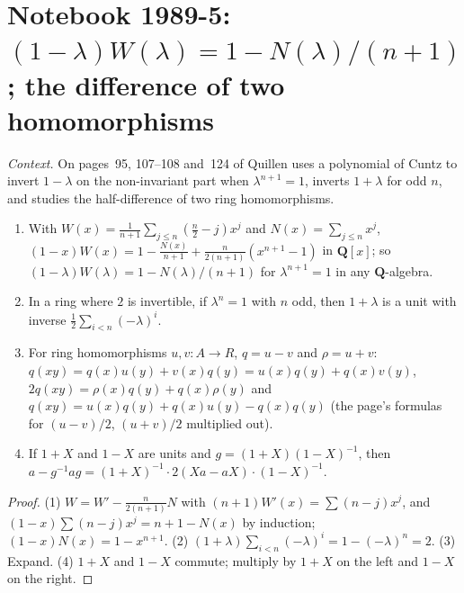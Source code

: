 \section[Notebook 1989-5: Cuntz's polynomial and two homomorphisms]{Notebook 1989-5: $(1 - \lambda)W(\lambda) = 1 - N(\lambda)/(n + 1)$; the difference of two homomorphisms\protect{}}\label{sec:quillen-1989-5}

\emph{Context.} On pages~95, 107--108 and~124 of  Quillen uses a polynomial of Cuntz to invert $1 - \lambda$ on the non-invariant part when $\lambda^{n+1} = 1$, inverts $1 + \lambda$ for odd $n$, and studies the half-difference of two ring homomorphisms.

\begin{encadre}
\begin{theoreme}\label{thm:quillen-1989-5}\leavevmode
\begin{enumerate}
\item With $W(x) = \frac{1}{n+1}\sum_{j \le n}(\frac n2 - j)x^j$ and $N(x) = \sum_{j \le n}x^j$, $(1 - x)W(x) = 1 - \frac{N(x)}{n + 1} + \frac{n}{2(n+1)}(x^{n+1} - 1)$ in $\mathbf Q[x]$; so $(1 - \lambda)W(\lambda) = 1 - N(\lambda)/(n + 1)$ for $\lambda^{n+1} = 1$ in any $\mathbf Q$-algebra.
\item In a ring where $2$ is invertible, if $\lambda^n = 1$ with $n$ odd, then $1 + \lambda$ is a unit with inverse $\frac12\sum_{i<n}(-\lambda)^i$.
\item For ring homomorphisms $u, v : A \to R$, $q = u - v$ and $\rho = u + v$: $q(xy) = q(x)u(y) + v(x)q(y) = u(x)q(y) + q(x)v(y)$, $2q(xy) = \rho(x)q(y) + q(x)\rho(y)$ and $q(xy) = u(x)q(y) + q(x)u(y) - q(x)q(y)$ (the page's formulas for $(u - v)/2$, $(u + v)/2$ multiplied out).
\item If $1 + X$ and $1 - X$ are units and $g = (1 + X)(1 - X)^{-1}$, then $a - g^{-1}ag = (1 + X)^{-1}\cdot 2(Xa - aX)\cdot(1 - X)^{-1}$.
\end{enumerate}
\end{theoreme}
\end{encadre}

\begin{proof}
(1) $W = W' - \frac{n}{2(n+1)}N$ with $(n + 1)W'(x) = \sum(n - j)x^j$, and $(1 - x)\sum(n - j)x^j = n + 1 - N(x)$ by induction; $(1 - x)N(x) = 1 - x^{n+1}$. (2) $(1 + \lambda)\sum_{i<n}(-\lambda)^i = 1 - (-\lambda)^n = 2$. (3) Expand. (4) $1 + X$ and $1 - X$ commute; multiply by $1 + X$ on the left and $1 - X$ on the right.
\end{proof}

